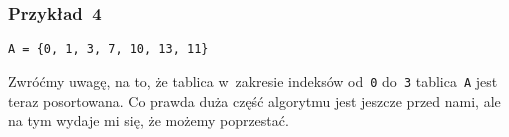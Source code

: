 \documentclass[10pt,t]{beamer}
\begin{document}
\begin{frame}
  \frametitle{Przykład~4}


  \texttt{A = \{0, 1, 3, 7, 10, 13, 11\}}

  Zwróćmy uwagę, na to, że tablica w~zakresie indeksów od~\texttt{0}
  do~\texttt{3} tablica~\texttt{A} jest teraz posortowana. Co prawda
  duża część algorytmu jest jeszcze przed nami, ale na tym wydaje mi się,
  że możemy poprzestać.










\end{frame}
\end{document}
